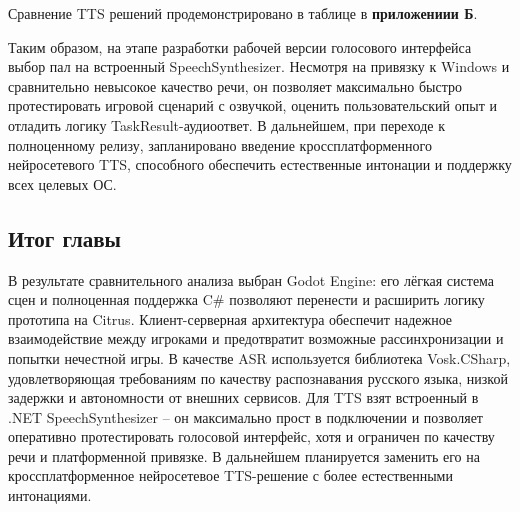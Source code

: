         Сравнение TTS решений продемонстрировано в таблице в \textbf{приложениии Б}.


        Таким образом, на этапе разработки рабочей версии голосового интерфейса выбор пал на встроенный SpeechSynthesizer. Несмотря на привязку к Windows и сравнительно невысокое 
        качество речи, он позволяет максимально быстро протестировать игровой сценарий с озвучкой, оценить пользовательский опыт и отладить логику TaskResult-аудиоответ. В дальнейшем, 
        при переходе к полноценному релизу, запланировано введение кроссплатформенного нейросетевого TTS, способного обеспечить естественные интонации и поддержку 
        всех целевых ОС.

    \subsection{Итог главы}
        В результате сравнительного анализа выбран Godot Engine: его лёгкая система сцен и полноценная поддержка C\# позволяют перенести и расширить логику прототипа на Citrus.
        Клиент-серверная архитектура обеспечит надежное взаимодействие между игроками и предотвратит возможные рассинхронизации и попытки нечестной игры.
        В качестве ASR используется библиотека Vosk.CSharp, удовлетворяющая требованиям по качеству распознавания русского языка, низкой задержки и 
        автономности от внешних сервисов. Для TTS взят встроенный в .NET SpeechSynthesizer -- он максимально прост в подключении и позволяет оперативно протестировать 
        голосовой интерфейс, хотя и ограничен по качеству речи и платформенной привязке. В дальнейшем планируется заменить его на кроссплатформенное нейросетевое TTS-решение 
        с более естественными интонациями.
